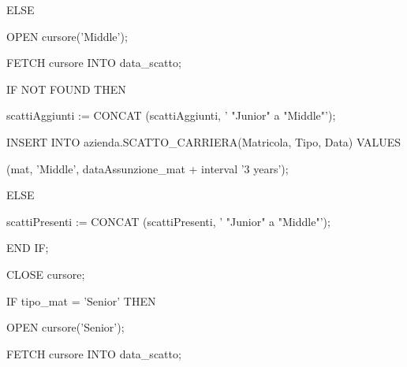 \begin{flushleft}
\begin{description}
\begin{description}
                        \item ELSE
                        \begin{description}
                            \item OPEN cursore('Middle');
                            \item FETCH cursore INTO data\_scatto; 

                            \item IF NOT FOUND THEN
                            \begin{description}
                                \item scattiAggiunti := CONCAT (scattiAggiunti, ' "Junior" a "Middle"');
                                \item INSERT INTO azienda.SCATTO\_CARRIERA(Matricola, Tipo, Data) VALUES
                                \item (mat, 'Middle', dataAssunzione\_mat + interval '3 years');
                            \end{description}
                        
                            \item ELSE
                            \begin{description}
                                \item scattiPresenti := CONCAT (scattiPresenti, ' "Junior" a "Middle"');
                            \end{description}
                            \item END IF;
                            \item CLOSE cursore;

                            \vspace{0.5cm}

                            \item IF tipo\_mat = 'Senior' THEN
                            \begin{description}
                                \item OPEN cursore('Senior');
                                \item FETCH cursore INTO data\_scatto; 


\end{description}
\end{description}
\end{description}
\end{description}
\end{flushleft}
